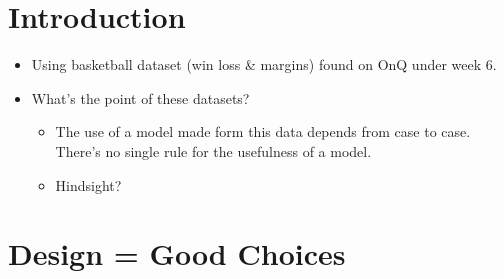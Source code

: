 
\section{Introduction}

\begin{itemize}
  \item Using basketball dataset (win loss \& margins) found on OnQ under week 6.
  \item What's the point of these datasets?
        \begin{itemize}
          \item The use of a model made form this data depends from case to case. There's no single rule for the usefulness of a model.
          \item Hindsight?
        \end{itemize}
\end{itemize}

\section{Design = Good Choices}

